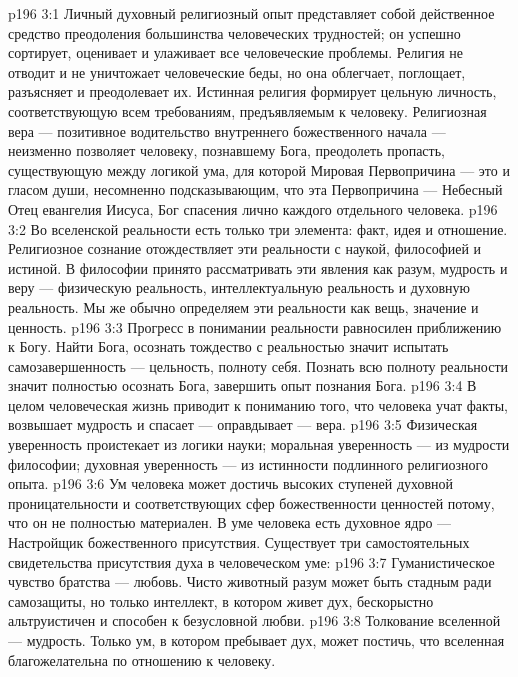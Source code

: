 \vs p196 3:1 Личный духовный религиозный опыт представляет собой действенное средство преодоления большинства человеческих трудностей; он успешно сортирует, оценивает и улаживает все человеческие проблемы. Религия не отводит и не уничтожает человеческие беды, но она облегчает, поглощает, разъясняет и преодолевает их. Истинная религия формирует цельную личность, соответствующую всем требованиям, предъявляемым к человеку. Религиозная вера --- позитивное водительство внутреннего божественного начала --- неизменно позволяет человеку, познавшему Бога, преодолеть пропасть, существующую между логикой ума, для которой Мировая Первопричина --- это  и гласом души, несомненно подсказывающим, что эта Первопричина ---  Небесный Отец евангелия Иисуса, Бог спасения лично каждого отдельного человека.
\vs p196 3:2 Во вселенской реальности есть только три элемента: факт, идея и отношение. Религиозное сознание отождествляет эти реальности с наукой, философией и истиной. В философии принято рассматривать эти явления как разум, мудрость и веру --- физическую реальность, интеллектуальную реальность и духовную реальность. Мы же обычно определяем эти реальности как вещь, значение и ценность.
\vs p196 3:3 Прогресс в понимании реальности равносилен приближению к Богу. Найти Бога, осознать тождество с реальностью значит испытать самозавершенность --- цельность, полноту себя. Познать всю полноту реальности значит полностью осознать Бога, завершить опыт познания Бога.
\vs p196 3:4 В целом человеческая жизнь приводит к пониманию того, что человека учат факты, возвышает мудрость и спасает --- оправдывает --- вера.
\vs p196 3:5 Физическая уверенность проистекает из логики науки; моральная уверенность --- из мудрости философии; духовная уверенность --- из истинности подлинного религиозного опыта.
\vs p196 3:6 Ум человека может достичь высоких ступеней духовной проницательности и соответствующих сфер божественности ценностей потому, что он не полностью материален. В уме человека есть духовное ядро --- Настройщик божественного присутствия. Существует три самостоятельных свидетельства присутствия духа в человеческом уме:
\vs p196 3:7 \bibnobreakspace Гуманистическое чувство братства --- любовь. Чисто животный разум может быть стадным ради самозащиты, но только интеллект, в котором живет дух, бескорыстно альтруистичен и способен к безусловной любви.
\vs p196 3:8 \pc {}\bibnobreakspace Толкование вселенной --- мудрость. Только ум, в котором пребывает дух, может постичь, что вселенная благожелательна по отношению к человеку.
